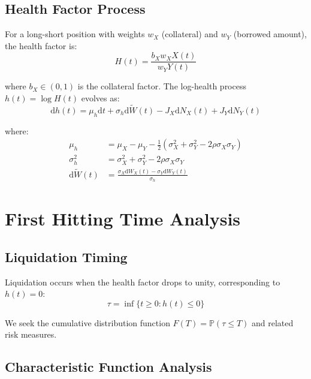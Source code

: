 \documentclass{article}
\renewcommand{\P}{\mathbb{P}}
\newcommand{\diff}{\mathrm{d}}
\theoremstyle{definition}
\begin{document}
\subsection{Health Factor Process}

For a long-short position with weights $w_X$ (collateral) and $w_Y$ (borrowed amount), the health factor is:
\begin{equation}
H(t) = \frac{b_X w_X X(t)}{w_Y Y(t)} \label{eq:health_factor}
\end{equation}

where $b_X \in (0,1)$ is the collateral factor. The log-health process $h(t) = \log H(t)$ evolves as:
\begin{equation}
\diff h(t) = \mu_h \diff t + \sigma_h \diff \tilde{W}(t) - J_X \diff N_X(t) + J_Y \diff N_Y(t) \label{eq:log_health_dynamics}
\end{equation}

where:
\begin{align}
\mu_h &= \mu_X - \mu_Y - \frac{1}{2}(\sigma_X^2 + \sigma_Y^2 - 2\rho\sigma_X\sigma_Y) \\
\sigma_h^2 &= \sigma_X^2 + \sigma_Y^2 - 2\rho\sigma_X\sigma_Y \\
\diff \tilde{W}(t) &= \frac{\sigma_X \diff W_X(t) - \sigma_Y \diff W_Y(t)}{\sigma_h}
\end{align}

\section{First Hitting Time Analysis}

\subsection{Liquidation Timing}

Liquidation occurs when the health factor drops to unity, corresponding to $h(t) = 0$:
\begin{equation}
\tau = \inf\{t \geq 0 : h(t) \leq 0\} \label{eq:stopping_time}
\end{equation}

We seek the cumulative distribution function $F(T) = \P(\tau \leq T)$ and related risk measures.

\subsection{Characteristic Function Analysis}
\end{document}
